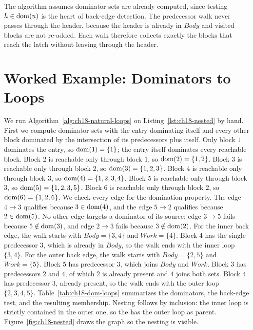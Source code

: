 The algorithm assumes dominator sets are already computed, since testing $h \in \operatorname{dom}(u)$ is the heart of back-edge detection.
The predecessor walk never passes through the header, because the header is already in $Body$ and visited blocks are not re-added.
Each walk therefore collects exactly the blocks that reach the latch without leaving through the header.

\section{Worked Example: Dominators to Loops}
\label{sec:ch18-worked-loops}

We run Algorithm~\ref{alg:ch18-natural-loops} on Listing~\ref{lst:ch18-nested} by hand.
First we compute dominator sets with the entry dominating itself and every other block dominated by the intersection of its predecessors plus itself.
Only block $1$ dominates the entry, so $\operatorname{dom}(1) = \{1\}$; the entry itself dominates every reachable block.
Block $2$ is reachable only through block $1$, so $\operatorname{dom}(2) = \{1, 2\}$.
Block $3$ is reachable only through block $2$, so $\operatorname{dom}(3) = \{1, 2, 3\}$.
Block $4$ is reachable only through block $3$, so $\operatorname{dom}(4) = \{1, 2, 3, 4\}$.
Block $5$ is reachable only through block $3$, so $\operatorname{dom}(5) = \{1, 2, 3, 5\}$.
Block $6$ is reachable only through block $2$, so $\operatorname{dom}(6) = \{1, 2, 6\}$.
We check every edge for the domination property.
The edge $4 \to 3$ qualifies because $3 \in \operatorname{dom}(4)$, and the edge $5 \to 2$ qualifies because $2 \in \operatorname{dom}(5)$.
No other edge targets a dominator of its source: edge $3 \to 5$ fails because $5 \notin \operatorname{dom}(3)$, and edge $2 \to 3$ fails because $3 \notin \operatorname{dom}(2)$.
For the inner back edge, the walk starts with $Body = \{3, 4\}$ and $Work = \{4\}$.
Block $4$ has the single predecessor $3$, which is already in $Body$, so the walk ends with the inner loop $\{3, 4\}$.
For the outer back edge, the walk starts with $Body = \{2, 5\}$ and $Work = \{5\}$.
Block $5$ has predecessor $3$, which joins $Body$ and $Work$.
Block $3$ has predecessors $2$ and $4$, of which $2$ is already present and $4$ joins both sets.
Block $4$ has predecessor $3$, already present, so the walk ends with the outer loop $\{2, 3, 4, 5\}$.
Table~\ref{tab:ch18-dom-loops} summarizes the dominators, the back-edge test, and the resulting membership.
Nesting follows by inclusion: the inner loop is strictly contained in the outer one, so the  has the outer loop as parent.
Figure~\ref{fig:ch18-nested} draws the graph so the nesting is visible.

